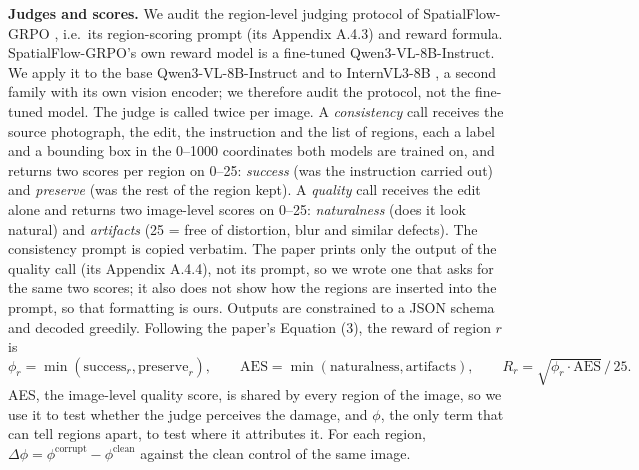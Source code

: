 \documentclass[10pt,a4paper]{article}
\begin{document}
\textbf{Judges and scores.} We audit the region-level judging protocol of SpatialFlow-GRPO \cite{yang2026spatialflow}, i.e.\ its region-scoring prompt (its Appendix A.4.3) and reward formula. SpatialFlow-GRPO's own reward model is a fine-tuned Qwen3-VL-8B-Instruct. We apply it to the base Qwen3-VL-8B-Instruct \cite{bai2025qwen3vl} and to InternVL3-8B \cite{zhu2025internvl3}, a second family with its own vision encoder; we therefore audit the protocol, not the fine-tuned model. The judge is called twice per image. A \emph{consistency} call receives the source photograph, the edit, the instruction and the list of regions, each a label and a bounding box in the 0--1000 coordinates both models are trained on, and returns two scores per region on 0--25: \emph{success} (was the instruction carried out) and \emph{preserve} (was the rest of the region kept). A \emph{quality} call receives the edit alone and returns two image-level scores on 0--25: \emph{naturalness} (does it look natural) and \emph{artifacts} (25 = free of distortion, blur and similar defects). The consistency prompt is copied verbatim. The paper prints only the output of the quality call (its Appendix A.4.4), not its prompt, so we wrote one that asks for the same two scores; it also does not show how the regions are inserted into the prompt, so that formatting is ours. Outputs are constrained to a JSON schema and decoded greedily. Following the paper's Equation (3), the reward of region $r$ is
\[
\phi_r = \min(\mathrm{success}_r, \mathrm{preserve}_r), \qquad
\mathrm{AES} = \min(\mathrm{naturalness}, \mathrm{artifacts}), \qquad
R_r = \sqrt{\phi_r \cdot \mathrm{AES}}\,/\,25 .
\]
AES, the image-level quality score, is shared by every region of the image, so we use it to test whether the judge perceives the damage, and $\phi$, the only term that can tell regions apart, to test where it attributes it. For each region, $\Delta\phi = \phi^{\mathrm{corrupt}} - \phi^{\mathrm{clean}}$ against the clean control of the same image.
\end{document}
